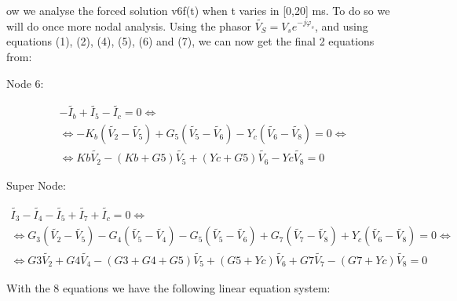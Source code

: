 ow we analyse the forced solution v6f(t) when t varies in [0,20] ms. To do so we will do once more nodal analysis. Using the phasor $\widetilde{V_S}=V_se^{-j\varphi_s}$, and using equations (1), (2), (4), (5), (6) and (7), we can now get the final 2 equations from:

Node 6:

\begin{gather}
	-\widetilde{I_b}+\widetilde{I_5}-\widetilde{I_c}=0 \iff \nonumber \\
    \iff -K_b(\widetilde{V_2}-\widetilde{V_5})+G_5(\widetilde{V_5}-\widetilde{V_6})-Y_c(\widetilde{V_6}-\widetilde{V_8})=0 \iff \\
    \iff  Kb\widetilde{V_2}-(Kb+G5)\widetilde{V_5}+(Yc+G5)\widetilde{V_6}-Yc\widetilde{V_8}=0 \nonumber
\end{gather}

Super Node:

\begin{gather}
	\widetilde{I_3}-\widetilde{I_4}-\widetilde{I_5}+\widetilde{I_7}+\widetilde{I_c}=0 \iff \nonumber \\
    \iff G_3(\widetilde{V_2}-\widetilde{V_5})-G_4(\widetilde{V_5}-\widetilde{V_4})-G_5(\widetilde{V_5}-\widetilde{V_6})+G_7(\widetilde{V_7}-\widetilde{V_8})+Y_c(\widetilde{V_6}-\widetilde{V_8})=0 \iff \\
    \iff G3\widetilde{V_2}+G4\widetilde{V_4} -(G3+G4+G5)\widetilde{V_5}+(G5+Yc)\widetilde{V_6}+G7\widetilde{V_7}-(G7+Yc)\widetilde{V_8}=0 \nonumber
\end{gather}

With the 8 equations we have the following linear equation system:

\vspace{10pt}

